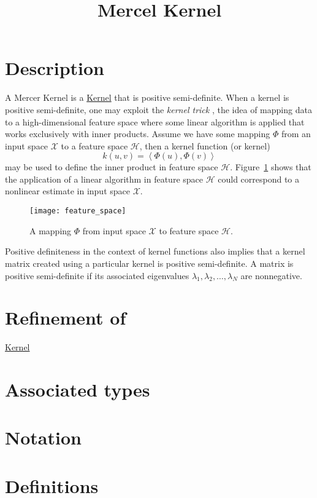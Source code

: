\documentclass{article}
\begin{document}
\title{Mercel Kernel}
\maketitle

\section*{Description}

A Mercer Kernel is a \href{\kmlroot/kernel.html}{Kernel} that is positive semi-definite.
When a kernel is positive semi-definite, 
one may exploit the \emph{kernel trick} \cite{aizerman64theoretical}, 
the idea of mapping data to a high-dimensional feature space where some linear algorithm is applied that works exclusively with inner products. Assume we have some mapping $\Phi$ from an input space $\mathcal{X}$ to a feature space $\mathcal{H}$, then a kernel function (or kernel)
%
$$ k(u,v)=\left\langle \Phi( u ), \Phi( v ) \right\rangle$$
%
may be used to define the inner product in feature space $\mathcal{H}$.
Figure~\ref{figure:feature_space} shows that the application of a linear algorithm in feature 
space $\mathcal{H}$ could correspond to a nonlinear estimate in input space $\mathcal{X}$.

\begin{figure}
\texttt{[image: feature\_space]}
\caption{A mapping $\Phi$ from input space $\mathcal{X}$ to feature space $\mathcal{H}$.}
\label{figure:feature_space}
\end{figure}

Positive definiteness in the context of kernel functions also implies that a 
kernel matrix created using 
a particular kernel is positive semi-definite. A matrix is positive semi-definite if its associated eigenvalues
$\lambda_1,\lambda_2,\ldots,\lambda_N$ are nonnegative.

\section*{Refinement of}

\href{\kmlroot/kernel.html}{Kernel}

\section*{Associated types}
\section*{Notation}
\section*{Definitions}
\end{document}
